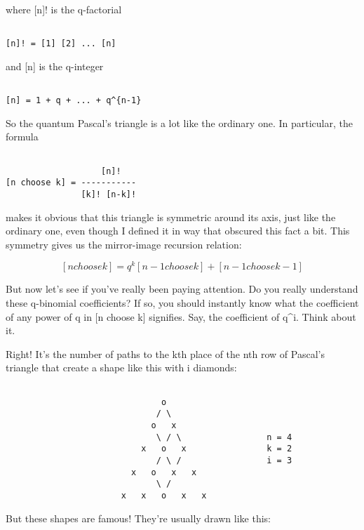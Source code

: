 where [n]! is the q-factorial


\begin{verbatim}

[n]! = [1] [2] ... [n]
\end{verbatim}
    
and [n] is the q-integer


\begin{verbatim}

[n] = 1 + q + ... + q^{n-1}
\end{verbatim}
    
So the quantum Pascal's triangle is a lot like the ordinary one.  
In particular, the formula 


\begin{verbatim}

                   [n]!
[n choose k] = -----------
               [k]! [n-k]!
\end{verbatim}
    
makes it obvious that this triangle is symmetric around its axis, just
like the ordinary one, even though I defined it in way that obscured
this fact a bit.  This symmetry gives us the mirror-image recursion
relation:


$$

[n choose k]  =  q^{k} [n-1 choose k]  +  [n-1 choose k-1]
$$
    
But now let's see if you've really been paying attention.  Do you really
understand these q-binomial coefficients?  If so, you should instantly
know what the coefficient of any power of q in [n choose k] signifies. 
Say, the coefficient of q^{i}.  Think about it.

Right!  It's the number of paths to the kth place of the nth row
of Pascal's triangle that create a shape like this with i diamonds:


\begin{verbatim}

                               o
                              / \
                             o   x
                              \ / \                 n = 4
                           x   o   x                k = 2
                              / \ /                 i = 3
                         x   o   x   x
                              \ /
                       x   x   o   x   x
\end{verbatim}
    
But these shapes are famous!  They're usually drawn like this:



